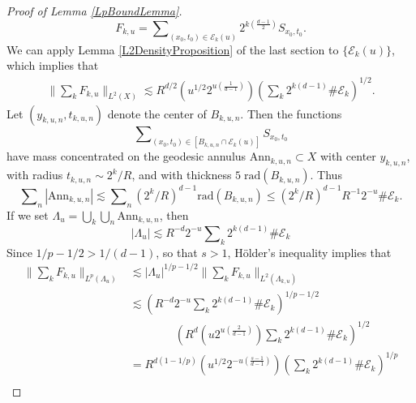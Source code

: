\begin{proof}[Proof of Lemma \ref{LpBoundLemma}]
%
\begin{equation}
    F_{k,u} = \sum\nolimits_{(x_0,t_0) \in \mathcal{E}_k(u)} 2^{k \left( \frac{d-1}{2} \right)} S\!_{x_0,t_0}.
\end{equation}
%
We can apply Lemma \ref{L2DensityProposition} of the last section to $\{ \mathcal{E}_k(u) \}$, which implies that
%
\begin{equation} \label{DOIWAJOIAJVOIWAJFOIWF}
\begin{split}
    \Big\| \sum\nolimits_k F_{k,u} \Big\|_{L^2(X)} \lesssim R^{d/2} \left( u^{1/2} 2^{u \left( \frac{1}{d-1} \right)} \right) \left( \sum\nolimits_k 2^{k(d-1)} \# \mathcal{E}_k \right)^{1/2}.
\end{split}
\end{equation}
%
Let $(y_{k,u,n}, t_{k,u,n})$ denote the center of $B_{k,u,n}$. Then the functions
%
\begin{equation}
    \sum\nolimits_{(x_0,t_0) \in [B_{k,u,n} \cap \mathcal{E}_k(u)]} S\!_{x_0,t_0}
\end{equation}
%
have mass concentrated on the geodesic annulus $\text{Ann}_{k,u,n} \subset X$ with center $y_{k,u,n}$, with radius $t_{k,u,n} \sim 2^{k} / R$, and with thickness $5\; \text{rad}(B_{k,u,n})$. Thus
%
\begin{equation}
    \sum\nolimits_n |\text{Ann}_{k,u,n}| \lesssim \sum\nolimits_{n} (2^{k} / R)^{d-1} \text{rad}(B_{k,u,n}) \leq (2^{k}/R)^{d-1} R^{-1} 2^{-u} \# \mathcal{E}_k.
\end{equation}
%
If we set $\Lambda_u = \bigcup_k \bigcup_n \text{Ann}_{k,u,n}$, then
%
\begin{equation}
    |\Lambda_u| \lesssim R^{-d} 2^{-u} \sum\nolimits_k 2^{k(d-1)} \# \mathcal{E}_k
\end{equation}
%
Since $1/p - 1/2 > 1/(d-1)$, so that $s > 1$, H\"{o}lder's inequality implies that
%
\begin{equation}
\begin{split}
    \Big\| \sum\nolimits_k F_{k,u} \Big\|_{L^p(\Lambda_u)} &\lesssim |\Lambda_u|^{1/p - 1/2} \Big\| \sum\nolimits_k F_{k,u} \Big\|_{L^2(\Lambda_{k,u})}\\
    &\lesssim \left( R^{-d} 2^{-u} \sum\nolimits_k 2^{k(d-1)} \# \mathcal{E}_k \right)^{1/p - 1/2}\\
    &\quad\quad\quad\quad \left( R^{d} \left( u 2^{u \left( \frac{2}{d-1} \right)} \right) \sum\nolimits_k 2^{k(d-1)} \# \mathcal{E}_k \right)^{1/2}\\
    &= R^{d(1-1/p)} \left( u^{1/2} 2^{-u \left( \frac{s - 1}{d - 1} \right)}  \right) \left( \sum\nolimits_k 2^{k(d-1)} \# \mathcal{E}_k \right)^{1/p}\\

\end{split}
\end{equation}
\end{proof}
